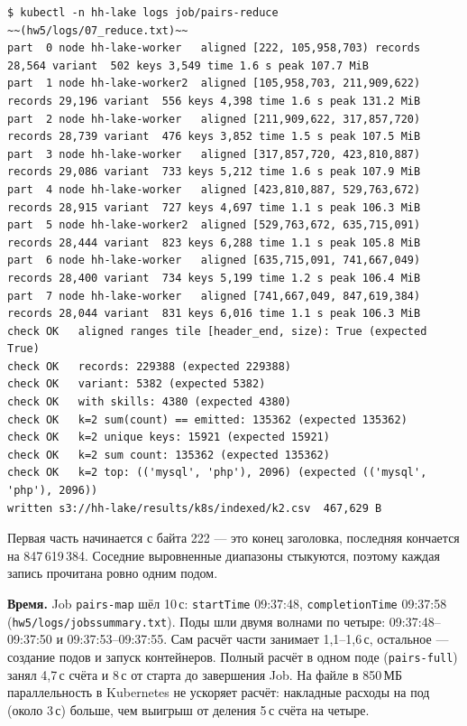 \documentclass[11pt,a4paper]{article}
\DeclareRobustCommand{\code}[1]{\begingroup\renewcommand{\_}{\textunderscore\allowbreak}\renewcommand{\slash}{/\allowbreak}\texttt{#1}\endgroup}
\newcommand{\logf}[1]{\code{hw5\slash logs\slash #1}}
\begin{document}
\begin{lstlisting}[basicstyle=\ttfamily\tiny]
$ kubectl -n hh-lake logs job/pairs-reduce                                    ~~(hw5/logs/07_reduce.txt)~~
part  0 node hh-lake-worker   aligned [222, 105,958,703) records 28,564 variant  502 keys 3,549 time 1.6 s peak 107.7 MiB
part  1 node hh-lake-worker2  aligned [105,958,703, 211,909,622) records 29,196 variant  556 keys 4,398 time 1.6 s peak 131.2 MiB
part  2 node hh-lake-worker   aligned [211,909,622, 317,857,720) records 28,739 variant  476 keys 3,852 time 1.5 s peak 107.5 MiB
part  3 node hh-lake-worker   aligned [317,857,720, 423,810,887) records 29,086 variant  733 keys 5,212 time 1.6 s peak 107.9 MiB
part  4 node hh-lake-worker   aligned [423,810,887, 529,763,672) records 28,915 variant  727 keys 4,697 time 1.1 s peak 106.3 MiB
part  5 node hh-lake-worker2  aligned [529,763,672, 635,715,091) records 28,444 variant  823 keys 6,288 time 1.1 s peak 105.8 MiB
part  6 node hh-lake-worker   aligned [635,715,091, 741,667,049) records 28,400 variant  734 keys 5,199 time 1.2 s peak 106.4 MiB
part  7 node hh-lake-worker   aligned [741,667,049, 847,619,384) records 28,044 variant  831 keys 6,016 time 1.1 s peak 106.3 MiB
check OK   aligned ranges tile [header_end, size): True (expected True)
check OK   records: 229388 (expected 229388)
check OK   variant: 5382 (expected 5382)
check OK   with skills: 4380 (expected 4380)
check OK   k=2 sum(count) == emitted: 135362 (expected 135362)
check OK   k=2 unique keys: 15921 (expected 15921)
check OK   k=2 sum count: 135362 (expected 135362)
check OK   k=2 top: (('mysql', 'php'), 2096) (expected (('mysql', 'php'), 2096))
written s3://hh-lake/results/k8s/indexed/k2.csv  467,629 B
\end{lstlisting}

Первая часть начинается с байта 222 --- это конец заголовка, последняя кончается на 847\,619\,384. Соседние выровненные диапазоны стыкуются, поэтому каждая запись прочитана ровно одним подом.

\textbf{Время.} Job \code{pairs-map} шёл 10\,с: \code{startTime} 09:37:48, \code{completionTime} 09:37:58 (\logf{12\_jobs\_summary.txt}). Поды шли двумя волнами по четыре: 09:37:48--09:37:50 и 09:37:53--09:37:55. Сам расчёт части занимает 1,1--1,6\,с, остальное --- создание подов и запуск контейнеров. Полный расчёт в одном поде (\code{pairs-full}) занял 4,7\,с счёта и 8\,с от старта до завершения Job. На файле в 850\,МБ параллельность в Kubernetes не ускоряет расчёт: накладные расходы на под (около 3\,с) больше, чем выигрыш от деления 5\,с счёта на четыре.
\end{document}
